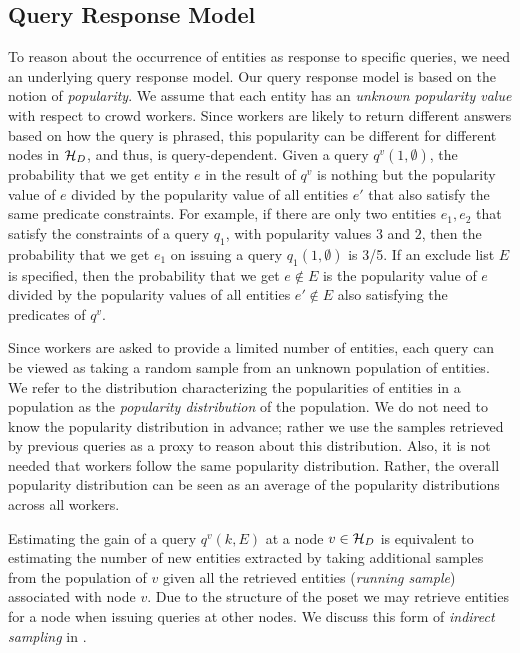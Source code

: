 \subsection{Query Response Model}
\label{sec:sampling}
To reason about the occurrence of entities as response to specific queries, we need an underlying query response model. Our query response model is based on the notion of {\em popularity}. We assume that each entity has an {\em unknown popularity value} with respect to crowd workers. Since workers are likely to return different answers based on how the query is phrased, this popularity can be different for different nodes in $\mathcal{H}_D$, and thus, is query-dependent. 
Given a query $q^v(1, \emptyset)$, the probability that we get entity $e$ in the result of $q^v$ is nothing but the popularity value of $e$ divided by the popularity value of all entities $e'$ that also satisfy the same predicate constraints. For example, if there are only two entities $e_1, e_2$ that satisfy the constraints of a query $q_1$, with popularity values $3$ and $2$, then the probability that we get $e_1$ on issuing a query $q_1(1, \emptyset)$ is 3/5. If an exclude list $E$ is specified, then the probability that we get $e \notin E$ is the popularity value of $e$ divided by the popularity values of all entities $e' \notin E$ also satisfying the predicates of $q^v$. 

Since workers are asked to provide a limited number of entities, each query can be viewed as taking a random sample from an unknown population of entities. We refer to the distribution characterizing the popularities of entities in a population as the {\em popularity distribution} of the population. We do not need to know the popularity distribution in advance; rather we use the samples retrieved by previous queries as a proxy to reason about this distribution. Also, it is not needed that workers follow the same popularity distribution. Rather, the overall popularity distribution can be seen as an average of the popularity distributions across all workers.

Estimating the gain of a query $q^v(k,E)$ at a node $v \in \mathcal{H}_D$ is equivalent to estimating the number of new entities extracted by taking additional samples from the population of $v$ given all the retrieved entities ({\em running sample}) associated with node $v$. Due to the structure of the poset we may retrieve entities for a node when issuing queries at other nodes. We discuss this form of {\em indirect sampling} in . 

